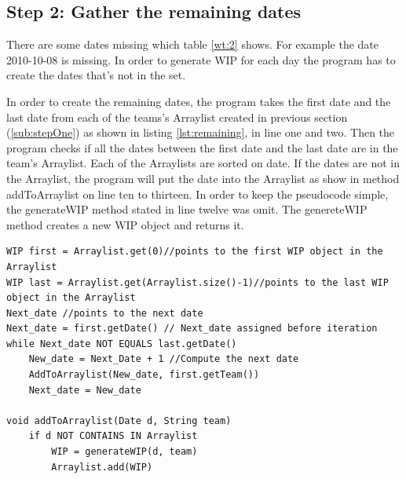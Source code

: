 \documentclass[UKenglish]{ifimaster}  %
\begin{document}
\subsection{Step 2: Gather the remaining dates}
 \label{sub:stepTwo}
There are some dates missing which table \ref{wt:2} shows. For example the date 2010-10-08 is missing. In order to generate WIP for each day the program has to create the dates that's not in the set. 
  
In order to create the remaining dates, the program takes the first date and the last date from each of the teams's Arraylist created in previous section (\ref{sub:stepOne}) as shown in listing \ref{lst:remaining}, in line one and two. Then the program checks if all the dates between the first date and the last date are in the team's Arraylist. Each of the Arraylists are sorted on date. If the dates are not in the Arraylist, the program will put the date into the Arraylist as show in method addToArraylist on line ten to thirteen.
In order to keep the pseudocode simple, the generateWIP method stated in line twelve was omit. The genereteWIP method creates a new WIP object and returns it. 

\begin{minipage}{\textwidth} 
\begin{lstlisting}[caption={Gather the remaining dates.},label={lst:remaining}]
WIP first = Arraylist.get(0)//points to the first WIP object in the Arraylist 
WIP last = Arraylist.get(Arraylist.size()-1)//points to the last WIP object in the Arraylist 
Next_date //points to the next date
Next_date = first.getDate() // Next_date assigned before iteration
while Next_date NOT EQUALS last.getDate()
	New_date = Next_Date + 1 //Compute the next date
	AddToArraylist(New_date, first.getTeam())
	Next_date = New_date

void addToArraylist(Date d, String team)
	if d NOT CONTAINS IN Arraylist
		WIP = generateWIP(d, team)
		Arraylist.add(WIP) 
 \end{lstlisting}
   \end{minipage}
\end{document}
